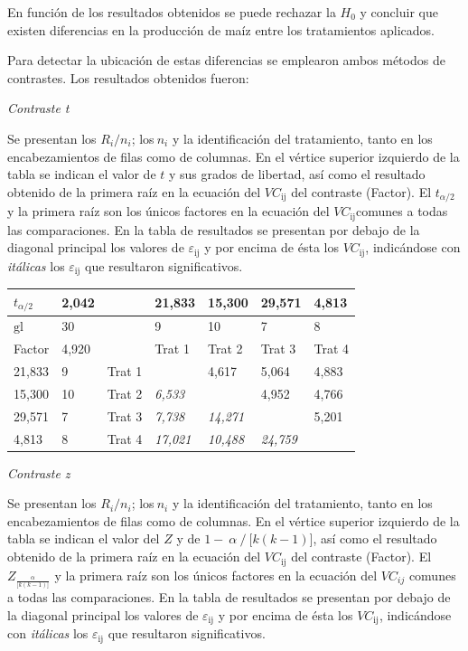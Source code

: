 \documentclass[]{book}
\theoremstyle{definition}
\theoremstyle{definition}
\theoremstyle{definition}
\theoremstyle{remark}
\begin{document}
En función de los resultados obtenidos se puede rechazar la \(H_{0}\) y
concluir que existen diferencias en la producción de maíz entre los
tratamientos aplicados.

Para detectar la ubicación de estas diferencias se emplearon ambos
métodos de contrastes. Los resultados obtenidos fueron:

\emph{Contraste t}

Se presentan los \(R_{i}/n_{i}\); los\(\ n_{i}\) y la identificación del
tratamiento, tanto en los encabezamientos de filas como de columnas. En
el vértice superior izquierdo de la tabla se indican el valor de \(t\) y
sus grados de libertad, así como el resultado obtenido de la primera
raíz en la ecuación del \(VC_{\text{ij}}\) del contraste (Factor). El
\(t_{\alpha/2\ }\) y la primera raíz son los únicos factores en la
ecuación del \(VC_{\text{ij}}\)comunes a todas las comparaciones. En la
tabla de resultados se presentan por debajo de la diagonal principal los
valores de \(\varepsilon_{\text{ij}}\) y por encima de ésta los
\(VC_{\text{ij}}\), indicándose con \emph{itálicas} los
\(\varepsilon_{\text{ij}}\) que resultaron significativos.

\begin{longtable}[]{@{}lllllll@{}}
\toprule
\(t_{\alpha/2\ }\) & 2,042 & & 21,833 & 15,300 & 29,571 &
4,813\tabularnewline
\midrule
\endhead
\(\text{gl}\) & 30 & & 9 & 10 & 7 & 8\tabularnewline
Factor & 4,920 & & Trat 1 & Trat 2 & Trat 3 & Trat 4\tabularnewline
21,833 & 9 & Trat 1 & & 4,617 & 5,064 & 4,883\tabularnewline
15,300 & 10 & Trat 2 & \emph{6,533} & & 4,952 & 4,766\tabularnewline
29,571 & 7 & Trat 3 & \emph{7,738} & \emph{14,271} & &
5,201\tabularnewline
4,813 & 8 & Trat 4 & \emph{17,021} & \emph{10,488} & \emph{24,759}
&\tabularnewline
\bottomrule
\end{longtable}

\emph{Contraste z}

Se presentan los \(R_{i}/n_{i}\); los\(\ n_{i}\) y la identificación del
tratamiento, tanto en los encabezamientos de filas como de columnas. En
el vértice superior izquierdo de la tabla se indican el valor del \(Z\)
y de \(1 - \ \alpha\ /\ \lbrack k(k - 1)\rbrack\), así como el resultado
obtenido de la primera raíz en la ecuación del \(VC_{\text{ij}}\) del
contraste (Factor). El
\(Z_{\frac{\alpha}{\lbrack k\left( k - 1 \right)\rbrack}}\) y la primera
raíz son los únicos factores en la ecuación del \(VC_{ij}\) comunes a
todas las comparaciones. En la tabla de resultados se presentan por
debajo de la diagonal principal los valores de
\(\varepsilon_{\text{ij}}\) y por encima de ésta los \(VC_{\text{ij}}\),
indicándose con \emph{itálicas} los \(\varepsilon_{\text{ij}}\) que
resultaron significativos.
\end{document}
